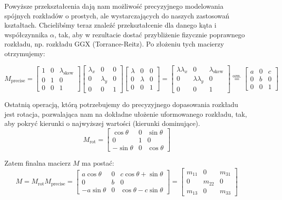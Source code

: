 \documentclass[../main.tex]{subfiles}
\begin{document}
Powyższe przekształcenia dają nam możliwość precyzyjnego modelowania spójnych rozkładów o prostych, ale wystarczających do naszych zastosowań kształtach. Chcielibśmy teraz znaleźć przekształcenie dla danego kąta i współczynnika $\alpha$, tak, aby w rezultacie dostać przybliżenie fizycznie poprawnego rozkładu, np. rozkładu GGX (Torrance-Reitz). Po złożeniu tych macierzy otrzymujemy:

\[
M_{\text{precise}} =
\begin{bmatrix}
1 & 0 & \lambda_{\text{skew}} \\
0 & 1 & 0 \\
0 & 0 & 1
\end{bmatrix}
\begin{bmatrix}
\lambda_x & 0 & 0 \\
0 & \lambda_y & 0 \\
0 & 0 & 1
\end{bmatrix}
\begin{bmatrix}
\lambda & 0 & 0 \\
0 & \lambda & 0 \\
0 & 0 & 1
\end{bmatrix}
=
\begin{bmatrix}
\lambda\lambda_x & 0 & \lambda_{\text{skew}} \\
0 & \lambda\lambda_y & 0 \\
0 & 0 & 1
\end{bmatrix}
\stackrel{\text{ozn.}}{=}
\begin{bmatrix}
a & 0 & c \\
0 & b & 0 \\
0 & 0 & 1
\end{bmatrix}
\]

Ostatnią operacją, którą potrzebujemy do precyzyjnego dopasowania rozkładu jest rotacja, pozwalająca nam na dokładne ułożenie uformowanego rozkładu, tak, aby pokryć kierunki o najwyższej wartości (kierunki dominujące). 
\[
M_{\text{rot}} =
\begin{bmatrix}
\cos\theta  & 0     & \sin\theta \\
0           & 1     & 0 \\
-\sin\theta & 0     & \cos\theta
\end{bmatrix}
\]

Zatem finalna macierz $M$ ma postać:
\[
M = M_{\text{rot}} M_{\text{precise}} = \begin{bmatrix}
a\cos\theta & 0 & c\cos\theta + \sin\theta \\
0 & b & 0 \\
-a\sin\theta & 0 & \cos\theta - c \sin\theta
\end{bmatrix} = \begin{bmatrix}
m_{11} & 0 & m_{31} \\
0 & m_{22} & 0 \\
m_{13} & 0 & m_{33}
\end{bmatrix}
\]
\end{document}
